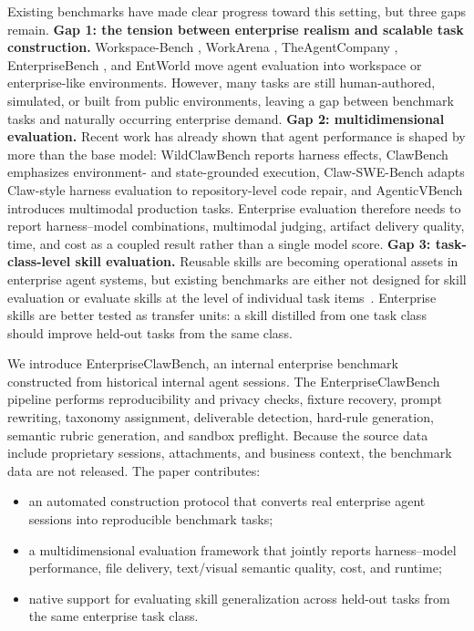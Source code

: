 \documentclass{llmxive}
\providecommand{\ecb}{EnterpriseClawBench}
\providecommand{\ecbpipe}{EnterpriseClawBench pipeline}
\providecommand{\hm}{harness--model}
\begin{document}
Existing benchmarks have made clear progress toward this setting, but three gaps remain. \textbf{Gap 1: the tension between enterprise realism and scalable task construction.} Workspace-Bench \citep{workspacebench2026}, WorkArena \citep{workarena2024}, TheAgentCompany \citep{theagentcompany2025}, EnterpriseBench \citep{enterprisebench2025}, and EntWorld \citep{entworld2026} move agent evaluation into workspace or enterprise-like environments. However, many tasks are still human-authored, simulated, or built from public environments, leaving a gap between benchmark tasks and naturally occurring enterprise demand. \textbf{Gap 2: multidimensional evaluation.} Recent work has already shown that agent performance is shaped by more than the base model: WildClawBench \citep{wildclawbench2026} reports harness effects, ClawBench \citep{clawbench2026} emphasizes environment- and state-grounded execution, Claw-SWE-Bench \citep{clawswebench2026} adapts Claw-style harness evaluation to repository-level code repair, and AgenticVBench \citep{agenticvbench2026} introduces multimodal production tasks. Enterprise evaluation therefore needs to report \hm{} combinations, multimodal judging, artifact delivery quality, time, and cost as a coupled result rather than a single model score. \textbf{Gap 3: task-class-level skill evaluation.} Reusable skills are becoming operational assets in enterprise agent systems, but existing benchmarks are either not designed for skill evaluation or evaluate skills at the level of individual task items~\citep{skillsbench2026}. Enterprise skills are better tested as transfer units: a skill distilled from one task class should improve held-out tasks from the same class.

We introduce \ecb{}, an internal enterprise benchmark constructed from historical internal agent sessions. The \ecbpipe{} performs reproducibility and privacy checks, fixture recovery, prompt rewriting, taxonomy assignment, deliverable detection, hard-rule generation, semantic rubric generation, and sandbox preflight. Because the source data include proprietary sessions, attachments, and business context, the benchmark data are not released. The paper contributes:
\begin{itemize}[leftmargin=*,itemsep=1pt,topsep=2pt]
  \item an automated construction protocol that converts real enterprise agent sessions into reproducible benchmark tasks;
  \item a multidimensional evaluation framework that jointly reports \hm{} performance, file delivery, text/visual semantic quality, cost, and runtime;
  \item native support for evaluating skill generalization across held-out tasks from the same enterprise task class.
\end{itemize}
\end{document}
